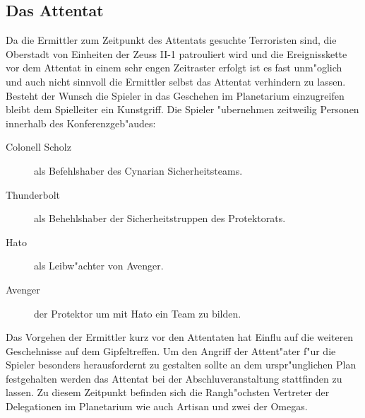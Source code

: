 \subsection{Das Attentat} 
Da die Ermittler zum Zeitpunkt des Attentats gesuchte Terroristen sind, die Oberstadt von Einheiten der Zeuss II-1 patrouliert wird und die
Ereignisskette vor dem Attentat in einem sehr engen Zeitraster erfolgt ist es fast unm"oglich und auch nicht sinnvoll die Ermittler selbst das Attentat verhindern zu lassen. Besteht der Wunsch die Spieler in das Geschehen im Planetarium einzugreifen bleibt dem Spielleiter ein Kunstgriff. Die Spieler "ubernehmen zeitweilig Personen innerhalb des Konferenzgeb"audes:

\begin{description}
	\item[Colonell Scholz] als Befehlshaber des Cynarian Sicherheitsteams.
	\item[Thunderbolt] als Behehlshaber der Sicherheitstruppen des Protektorats.
	\item[Hato] als Leibw"achter von Avenger.
	\item[Avenger] der Protektor um mit Hato ein Team zu bilden.
\end{description}

Das Vorgehen der Ermittler kurz vor den Attentaten hat Einflu\3 auf die weiteren Geschehnisse auf dem Gipfeltreffen. Um den Angriff der Attent"ater f"ur die Spieler besonders herausfordernt zu gestalten sollte an dem urspr"unglichen Plan festgehalten werden das Attentat bei der Abschlu\3veranstaltung stattfinden zu lassen. Zu diesem Zeitpunkt befinden sich die Rangh"ochsten Vertreter der Delegationen im Planetarium wie auch Artisan und zwei der Omegas.

